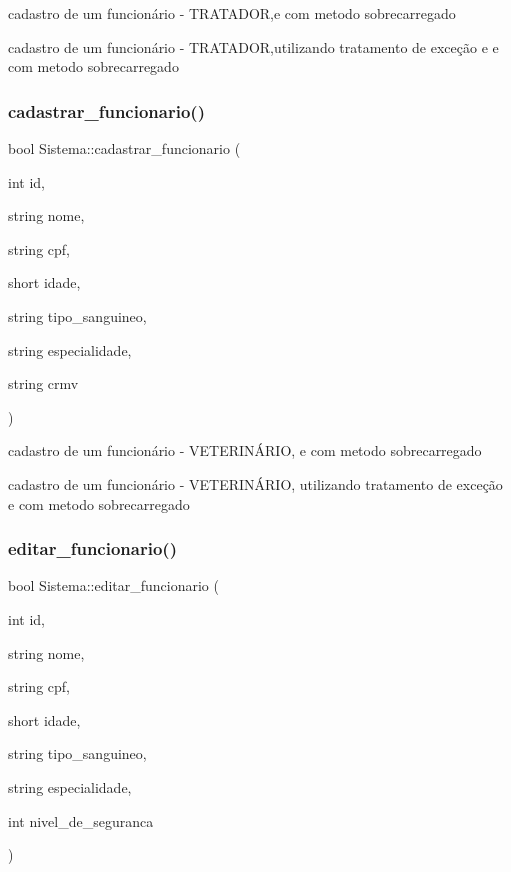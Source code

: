 cadastro de um funcionário -\/ T\+R\+A\+T\+A\+D\+OR,e com metodo sobrecarregado 

cadastro de um funcionário -\/ T\+R\+A\+T\+A\+D\+OR,utilizando tratamento de exceção e e com metodo sobrecarregado \mbox{\label{class_sistema_a1cb053a5708ed71b300417b00d4fa849}} 
\subsubsection{\texorpdfstring{cadastrar\_funcionario()}{cadastrar\_funcionario()}\hspace{0.1cm}{\footnotesize\ttfamily [2/2]}}
{\footnotesize\ttfamily bool Sistema\+::cadastrar\+\_\+funcionario (\begin{DoxyParamCaption}\item[{int}]{id,  }\item[{string}]{nome,  }\item[{string}]{cpf,  }\item[{short}]{idade,  }\item[{string}]{tipo\+\_\+sanguineo,  }\item[{string}]{especialidade,  }\item[{string}]{crmv }\end{DoxyParamCaption})}



cadastro de um funcionário -\/ V\+E\+T\+E\+R\+I\+NÁ\+R\+IO, e com metodo sobrecarregado 

cadastro de um funcionário -\/ V\+E\+T\+E\+R\+I\+NÁ\+R\+IO, utilizando tratamento de exceção e com metodo sobrecarregado \mbox{\label{class_sistema_a820add3f6f6710ff817922b96b591765}} 
\subsubsection{\texorpdfstring{editar\_funcionario()}{editar\_funcionario()}\hspace{0.1cm}{\footnotesize\ttfamily [1/2]}}
{\footnotesize\ttfamily bool Sistema\+::editar\+\_\+funcionario (\begin{DoxyParamCaption}\item[{int}]{id,  }\item[{string}]{nome,  }\item[{string}]{cpf,  }\item[{short}]{idade,  }\item[{string}]{tipo\+\_\+sanguineo,  }\item[{string}]{especialidade,  }\item[{int}]{nivel\+\_\+de\+\_\+seguranca }\end{DoxyParamCaption})}



